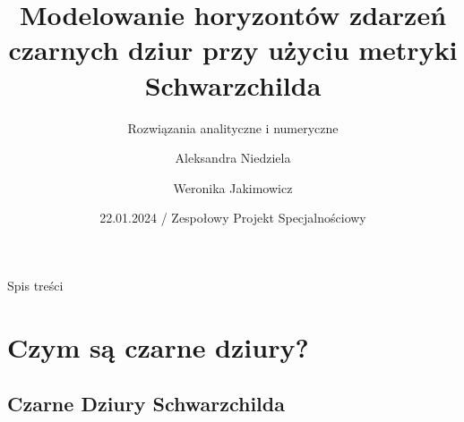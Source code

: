 \documentclass[polish, 9pt, xcolor=table, hyperref={pdfpagemode=FullScreen}]{beamer}
\title[Czarne Dziury Schwarzchilda] %
{Modelowanie horyzontów zdarzeń czarnych dziur przy użyciu metryki Schwarzchilda}
\subtitle
{Rozwiązania analityczne i numeryczne } %
\author[Aleksandra Niedziela, Weronika Jakimowicz] %
{Aleksandra Niedziela \and Weronika Jakimowicz}
\institute[Uniwersytet Wrocławski] %
{
  Wydział Matematyki i Informatyki\\
  Uniwersytet Wrocławski
 }
\date[Short Occasion] %
{22.01.2024 / Zespołowy Projekt Specjalnościowy}
\begin{document}
\begin{frame}
  \titlepage
\end{frame}

\begin{frame}{Spis treści}
  \tableofcontents
\end{frame}




\section{Czym są czarne dziury?}

\subsection[Czarne Dziura Schwarzchilda]{Czarne Dziury Schwarzchilda}
\end{document}
